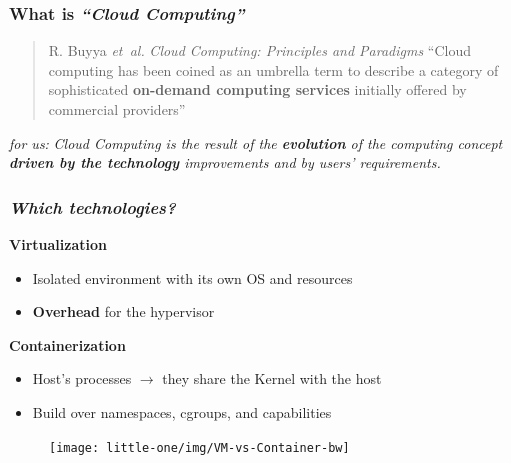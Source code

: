 \begin{frame}
  \frametitle{ What is \textit{``Cloud Computing''}}

  \begin{quote}{R. Buyya \emph{et~al.} \textit{Cloud Computing: Principles and Paradigms}}
    ``Cloud computing has been coined as an umbrella term to describe a category of
    sophisticated \alert{\textbf{on-demand computing services}} initially offered by commercial providers''
  \end{quote}

  \pause

  \begin{block}{ \textit{for us:}}
    \textit{
      Cloud Computing is the result of the \alert{\textbf{evolution}} of the computing concept
      \alert{\textbf{driven by the technology}} improvements and by users’ requirements.
    }
  \end{block}
\end{frame}

\begin{frame}
  \frametitle{ \textit{Which
      technologies?}}

   \textbf{Virtualization}
  \begin{itemize}
    \itemsep0em
    \item Isolated environment with its own OS and resources
    \item \textbf{\alert{Overhead}} for the \alert{hypervisor}
  \end{itemize}

   \textbf{Containerization}
  \begin{itemize}
    \itemsep0em
    \item Host's \alert{processes} $\to$ they share the Kernel with the host
    \item Build over \alert{namespaces}, \alert{cgroups}, and \alert{capabilities}
  \end{itemize}

   \begin{figure}
    \centering
    \texttt{[image: little-one/img/VM-vs-Container-bw]}
  \end{figure}
\end{frame}


